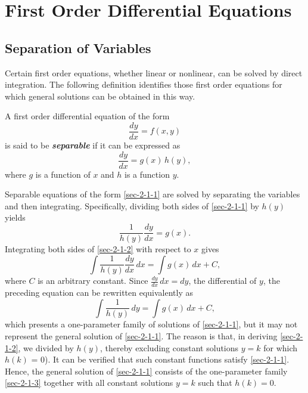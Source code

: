 \setcounter{chapter}{1}
\chapter{First Order Differential Equations}
\minitoc

\section{Separation of Variables}
Certain first order equations, whether linear or nonlinear, can be solved by direct integration. The following definition identifies those first order equations for which general solutions can be obtained in this way.

\begin{leftbar}
	\begin{definition}\label{def-seperable}
		A  first order differential equation of the form \[\frac{dy}{dx} = f(x, y)\]  is  said to be \textbf{\textit{separable}} if it can be expressed as
		\begin{equation}\label{sec-2-1-1}
			\frac{dy}{dx} = g(x)\,h(y),
		\end{equation} 
		where $g$ is a function of $x$  and $h$ is a function $y$.
	\end{definition}
\end{leftbar}
Separable equations of the form \eqref{sec-2-1-1} are solved by separating the variables and then integrating. Specifically, dividing both sides of \eqref{sec-2-1-1} by \(h(y)\) yields
\begin{equation}\label{sec-2-1-2}
	\frac{1}{h(y)}\frac{dy}{dx} = g(x).
\end{equation}
Integrating both sides of \eqref{sec-2-1-2} with respect to \(x\) gives
\[
\int \frac{1}{h(y)}\frac{dy}{dx}\, dx = \int g(x)\, dx + C,
\]
where \(C\) is an arbitrary constant. Since \( \frac{dy}{dx}\,dx = dy \), the differential of \(y\), the preceding equation can be rewritten equivalently as
\begin{equation}\label{sec-2-1-3}
	\int \frac{1}{h(y)}\,dy = \int g(x)\,dx + C,
\end{equation}
which presents a one-parameter family of solutions of \eqref{sec-2-1-1}, but it may not represent the  general solution of \eqref{sec-2-1-1}.
The reason is that, in deriving \eqref{sec-2-1-2}, we  divided by \(h(y)\),  thereby excluding constant solutions \(y = k\) for which \(h(k)\) = 0). It can be verified that such constant functions satisfy \eqref{sec-2-1-1}. Hence, the general solution of \eqref{sec-2-1-1} consists of the one-parameter family \eqref{sec-2-1-3} together with all constant solutions \(y = k\) such that \(h(k) = 0\).

